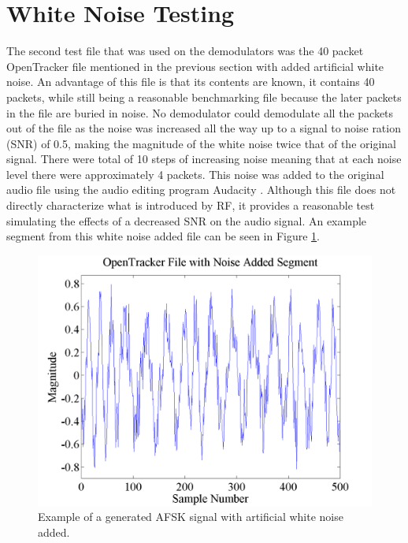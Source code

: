\section{White Noise Testing}
The second test file that was used on the demodulators was the 40 packet OpenTracker file mentioned in the previous section with added artificial white noise. An advantage of this file is that its contents are known, it contains 40 packets, while still being a reasonable benchmarking file because the later packets in the file are buried in noise. No demodulator could demodulate all the packets out of the file as the noise was increased all the way up to a signal to noise ration (SNR) of 0.5, making the magnitude of the white noise twice that of the original signal. There were total of 10 steps of increasing noise meaning that at each noise level there were approximately 4 packets. This noise was added to the original audio file using the audio editing program Audacity \cite{Mazzoni}. Although this file does not directly characterize what is introduced by RF, it provides a reasonable test simulating the effects of a decreased SNR on the audio signal. An example segment from this white noise added file can be seen in Figure \ref{OT3TestwNoiseSegment}.
\begin{figure}
  \centering
	\includegraphics[width=0.75\linewidth]{images/OpenTrackerFilewithNoiseAddedSegment.png} 
	\caption{Example of a generated AFSK signal with artificial white noise added.}
   \label{OT3TestwNoiseSegment}
\end{figure}
 
